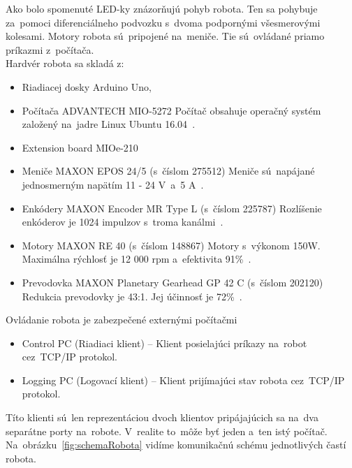 \clearpage

Ako bolo spomenuté LED-ky znázorňujú pohyb robota. Ten sa pohybuje za~pomoci diferenciálneho podvozku s~dvoma
podpornými všesmerovými kolesami. Motory robota sú~pripojené na~meniče. Tie sú~ovládané priamo príkazmi z~počítača.\\

\noindent Hardvér robota sa skladá z:
\begin{itemize}
	\item Riadiacej dosky Arduino Uno,

	\item Počítača ADVANTECH MIO-5272 \newline
		Počítač obsahuje operačný systém založený na~jadre Linux Ubuntu 16.04~\cite{robotPc}.

	\item Extension board MIOe-210~\cite{extensionModule}

	\item Meniče MAXON EPOS 24/5 (s~číslom 275512) \newline
	 	Meniče sú~napájané jednosmerným napätím 11 - 24 V~a~5 A~\cite{menic}.

	\item Enkódery MAXON Encoder MR Type L (s~číslom 225787) \newline
		Rozlíšenie enkóderov je 1024 impulzov s~troma kanálmi~\cite{encoder}.

	\item Motory MAXON RE 40 (s~číslom 148867) \newline
		Motory s~výkonom 150W. Maximálna rýchlosť je 12 000 rpm a~efektivita 91\%~\cite{motor}.

	\item Prevodovka MAXON Planetary Gearhead GP 42 C (s~číslom 202120) \newline
		Redukcia prevodovky je 43:1. Jej účinnosť je 72\%~\cite{prevodovka}.
\end{itemize}

\noindent Ovládanie robota je zabezpečené externými počítačmi
\begin{itemize}
	\item Control PC (Riadiaci klient) -- Klient posielajúci príkazy na~robot cez~TCP/IP protokol.
	\item Logging PC (Logovací klient) -- Klient prijímajúci stav robota cez~TCP/IP protokol.
\end{itemize}

\noindent Títo klienti sú~len reprezentáciou dvoch klientov pripájajúcich sa na~dva separátne porty na~robote.
V~realite to~môže byť jeden a~ten istý počítač. Na~obrázku~\ref{fig:schemaRobota} vidíme komunikačnú schému
jednotlivých častí robota.

